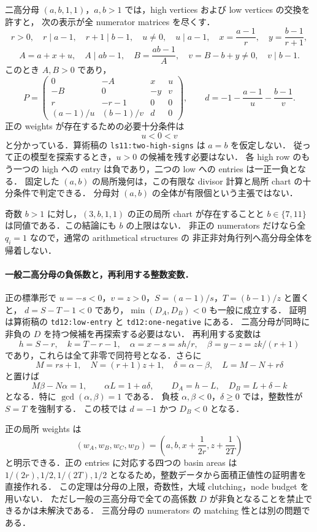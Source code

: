 二高分母 $(a,b,1,1)$，$a,b>1$ では，high vertices および low vertices の交換を許すと，
次の表示が全 numerator matrices を尽くす．
\[
 r>0,\quad r\mid a-1,\quad r+1\mid b-1,\quad
 u\ne0,\quad u\mid a-1,\quad
 x=\frac{a-1}{r},\quad y=\frac{b-1}{r+1},
\]
\[
 A=a+x+u,\quad A\mid ab-1,\quad
 B=\frac{ab-1}{A},\quad v=B-b+y\ne0,\quad v\mid b-1.
\]
このとき $A,B>0$ であり，
\[
 P=\begin{pmatrix}
 0&-A&x&u\\
 -B&0&-y&v\\
 r&-r-1&0&0\\
 (a-1)/u&(b-1)/v&d&0
 \end{pmatrix},\qquad
 d=-1-\frac{a-1}{u}-\frac{b-1}{v}.
\]
正の weights が存在するための必要十分条件は
\[
 u<0<v
\]
と分かっている．算術稿の \texttt{ls11:two-high-signs} は $a=b$ を仮定しない．
従って正の模型を探索するとき，$u>0$ の候補を残す必要はない．
各 high row のもう一つの high への entry は負であり，二つの low への entries は一正一負となる．
固定した $(a,b)$ の局所幾何は，この有限な divisor 計算と局所 chart の十分条件で判定できる．
分母対 $(a,b)$ の全体が有限個という主張ではない．

奇数 $b>1$ に対し，$(3,b,1,1)$ の正の局所 chart が存在することと
$b\in\{7,11\}$ は同値である．この結論にも $b$ の上限はない．
非正の numerators だけなら全 $q_i=1$ なので，通常の arithmetical structures の
非正非対角行列\cite[\S\S1--3]{CorralesValencia}へ高分母全体を帰着しない．

\paragraph{一般二高分母の負係数と，再利用する整数変数．}
正の標準形で $u=-s<0$，$v=z>0$，$S=(a-1)/s$，$T=(b-1)/z$ と置くと，
$d=S-T-1<0$ であり，$\min(D_A,D_B)<0$ も一般に成立する．
証明は算術稿の \texttt{td12:low-entry} と \texttt{td12:one-negative} にある．
二高分母が同時に非負の $D$ を持つ候補を再探索する必要はない．
再利用する変数は
\[
 h=S-r,\quad k=T-r-1,\quad
 \alpha=x-s=sh/r,\quad \beta=y-z=zk/(r+1)
\]
であり，これらは全て非零で同符号となる．さらに
\[
 M=rs+1,\quad N=(r+1)z+1,\quad
 \delta=\alpha-\beta,\quad L=M-N+r\delta
\]
と置けば
\[
 M\beta-N\alpha=1,\qquad \alpha L=1+a\delta,
 \qquad D_A=h-L,\quad D_B=L+\delta-k
\]
となる．特に $\gcd(\alpha,\beta)=1$ である．
負枝 $\alpha,\beta<0$，$\delta\geq0$ では，整数性が $S=T$ を強制する．
この枝では $d=-1$ かつ $D_B<0$ となる．

正の局所 weights は
\[
 (w_A,w_B,w_C,w_D)
 =\left(a,b,x+\frac1{2r},z+\frac1{2T}\right)
\]
と明示できる．正の entries に対応する四つの basin areas は
$1/(2r),1/2,1/(2T),1/2$ となるため，整数データから面積正値性の証明書を直接作れる．
この定理は分母の上限，奇数性，大域 clutching，node budget を用いない．
ただし一般の三高分母で全ての高係数 $D$ が非負となることを禁止できるかは未解決である．
三高分母の numerators の matching 性とは別の問題である．

